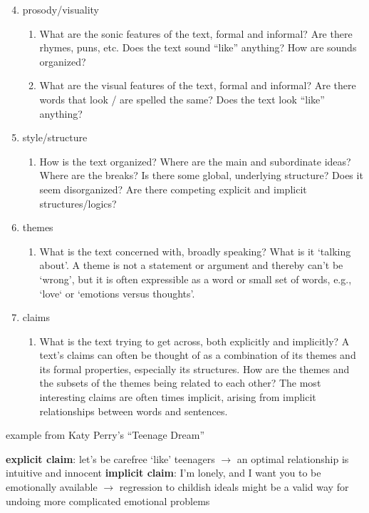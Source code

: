 \documentclass[12pt]{article}
\begin{document}
\begin{enumerate}
\setcounter{enumi}{3}
\item prosody/visuality
    \begin{enumerate}
    \item What are the sonic features of the text, formal and informal? Are there rhymes, puns, etc. Does the text sound “like” anything? How are sounds organized?
    \item What are the visual features of the text, formal and informal? Are there words that look / are spelled the same? Does the text look “like” anything?
    \end{enumerate}
\item style/structure
    \begin{enumerate}
    \item How is the text organized? Where are the main and subordinate ideas? Where are the breaks? Is there some global, underlying structure? Does it seem disorganized? Are there competing explicit and implicit structures/logics?
    \end{enumerate}
\item themes
    \begin{enumerate}
    \item What is the text concerned with, broadly speaking? What is it `talking about'. A theme is not a statement or argument and thereby can’t be `wrong', but it is often expressible as a word or small set of words, e.g., `love` or `emotions versus thoughts'. 
    \end{enumerate}
\item claims
    \begin{enumerate}
    \item What is the text trying to get across, both explicitly and implicitly? A text’s claims can often be thought of as a combination of its themes and its formal properties, especially its structures.  How are the themes and the subsets of the themes being related to each other? The most interesting claims are often times implicit, arising from implicit relationships between words and sentences. 
    \end{enumerate}
\end{enumerate}

\begin{exe}
\ex example from Katy Perry's ``Teenage Dream''
    \begin{xlist}
    \ex \textbf{explicit claim}: let's be carefree `like' teenagers $\rightarrow$ an optimal relationship is intuitive and innocent
    \ex \textbf{implicit claim}: I'm lonely, and I want you to be emotionally available $\rightarrow$ regression to childish ideals might be a valid way for undoing more complicated emotional problems
    \end{xlist}
\end{exe}
\end{document}
